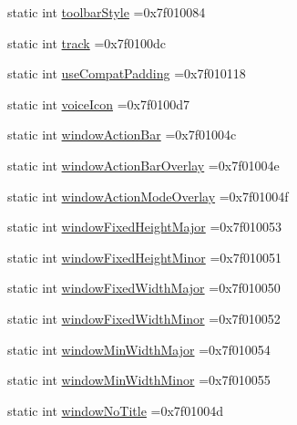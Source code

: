 \begin{DoxyCompactItemize}
\item 
static int \hyperlink{classandroid_1_1support_1_1v4_1_1R_1_1attr_ab78bc91d2584ed157ab4c6f941adc567}{toolbar\+Style} =0x7f010084
\item 
static int \hyperlink{classandroid_1_1support_1_1v4_1_1R_1_1attr_ad9d65c0fbafbf126efc40c5c1d6a467b}{track} =0x7f0100dc
\item 
static int \hyperlink{classandroid_1_1support_1_1v4_1_1R_1_1attr_a0a5254de741dc249871162023aef2477}{use\+Compat\+Padding} =0x7f010118
\item 
static int \hyperlink{classandroid_1_1support_1_1v4_1_1R_1_1attr_ad22fdc68658d936869e5756cda1b2d6f}{voice\+Icon} =0x7f0100d7
\item 
static int \hyperlink{classandroid_1_1support_1_1v4_1_1R_1_1attr_a353d40cb93c69197c58c3f4b7364b41f}{window\+Action\+Bar} =0x7f01004c
\item 
static int \hyperlink{classandroid_1_1support_1_1v4_1_1R_1_1attr_a367af79f12a7d7ea5d9c5a55e0f1c09b}{window\+Action\+Bar\+Overlay} =0x7f01004e
\item 
static int \hyperlink{classandroid_1_1support_1_1v4_1_1R_1_1attr_addc952329a9579398057228fff4e4326}{window\+Action\+Mode\+Overlay} =0x7f01004f
\item 
static int \hyperlink{classandroid_1_1support_1_1v4_1_1R_1_1attr_a8a7cdfacf627f6189a625fc5a284b096}{window\+Fixed\+Height\+Major} =0x7f010053
\item 
static int \hyperlink{classandroid_1_1support_1_1v4_1_1R_1_1attr_a5d8371968478fdd70167d3680af2df23}{window\+Fixed\+Height\+Minor} =0x7f010051
\item 
static int \hyperlink{classandroid_1_1support_1_1v4_1_1R_1_1attr_af5000fa0a4ad63741928b9588aadab35}{window\+Fixed\+Width\+Major} =0x7f010050
\item 
static int \hyperlink{classandroid_1_1support_1_1v4_1_1R_1_1attr_af403718d44d96e714cbf73376eff3f80}{window\+Fixed\+Width\+Minor} =0x7f010052
\item 
static int \hyperlink{classandroid_1_1support_1_1v4_1_1R_1_1attr_a331daac6525b467fa201e2659110760e}{window\+Min\+Width\+Major} =0x7f010054
\item 
static int \hyperlink{classandroid_1_1support_1_1v4_1_1R_1_1attr_a564927dd9bc70402dc96e92101cca431}{window\+Min\+Width\+Minor} =0x7f010055
\item 
static int \hyperlink{classandroid_1_1support_1_1v4_1_1R_1_1attr_a1f9a8ba450a55992fbdcd19844780477}{window\+No\+Title} =0x7f01004d
\end{DoxyCompactItemize}


